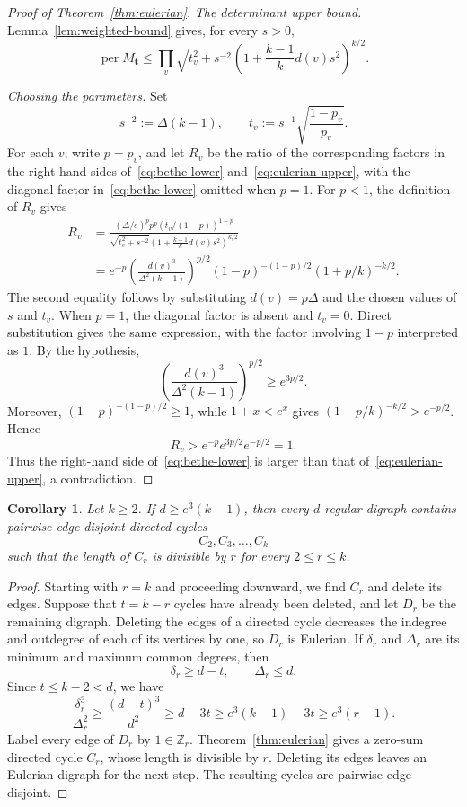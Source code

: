 \documentclass[11pt]{amsart}
\newtheorem{corollary}[theorem]{Corollary}
\theoremstyle{remark}
\newcommand{\per}{\operatorname{per}}
\begin{document}
\begin{proof}[Proof of Theorem~\ref{thm:eulerian}]
\medskip\noindent
\emph{The determinant upper bound.}
Lemma~\ref{lem:weighted-bound} gives, for every $s>0$,
\begin{equation}\label{eq:eulerian-upper}
  \per M_{\mathbf t}
  \le
  \prod_v
  \sqrt{t_v^2+s^{-2}}
  \left(1+\frac{k-1}{k}d(v)s^2\right)^{k/2}.
\end{equation}

\medskip\noindent
\emph{Choosing the parameters.}
Set
\[
  s^{-2}:=\Delta(k-1),
  \qquad
  t_v
  :=s^{-1}\sqrt{\frac{1-p_v}{p_v}}.
\]
For each $v$, write $p=p_v$, and let $R_v$ be the ratio of the
corresponding factors in the right-hand
sides of~\eqref{eq:bethe-lower} and~\eqref{eq:eulerian-upper}, with the
diagonal factor in~\eqref{eq:bethe-lower} omitted when $p=1$.
For $p<1$, the definition of $R_v$ gives
\begin{align*}
  R_v
  &=
  \frac{(\Delta/e)^p p^p
    \left(t_v/(1-p)\right)^{1-p}}
  {\sqrt{t_v^2+s^{-2}}
    \left(1+\frac{k-1}{k}d(v)s^2\right)^{k/2}}\\
  &=e^{-p}
  \left(\frac{d(v)^3}{\Delta^2(k-1)}\right)^{p/2}
  (1-p)^{-(1-p)/2}
  (1+p/k)^{-k/2}.
\end{align*}
The second equality follows by substituting $d(v)=p\Delta$ and the
chosen values of $s$ and $t_v$.
When $p=1$, the diagonal factor is absent and $t_v=0$.  Direct
substitution gives the same expression, with the factor involving
$1-p$ interpreted as $1$.  By the hypothesis,
\[
  \left(\frac{d(v)^3}{\Delta^2(k-1)}\right)^{p/2}
  \ge e^{3p/2}.
\]
Moreover, $(1-p)^{-(1-p)/2}\ge1$, while $1+x<e^x$ gives
$(1+p/k)^{-k/2}>e^{-p/2}$.  Hence
\[
  R_v>e^{-p}e^{3p/2}e^{-p/2}=1.
\]
Thus the right-hand side of~\eqref{eq:bethe-lower} is larger than that
of~\eqref{eq:eulerian-upper}, a contradiction.
\end{proof}

\begin{corollary}\label{cor:all-moduli}
Let $k\ge2$.  If $d\ge e^3(k-1)$, then every $d$-regular digraph
contains pairwise edge-disjoint directed cycles
\[
  C_2,C_3,\ldots,C_k
\]
such that the length of $C_r$ is divisible by $r$ for every
$2\le r\le k$.
\end{corollary}

\begin{proof}
Starting with $r=k$ and proceeding downward, we find $C_r$ and delete
its edges.  Suppose that $t=k-r$ cycles have already been deleted, and
let $D_r$ be the remaining digraph.  Deleting the edges of a directed
cycle decreases the indegree and outdegree of each of its vertices by
one, so $D_r$ is Eulerian.  If $\delta_r$ and $\Delta_r$ are its minimum
and maximum common degrees, then
\[
  \delta_r\ge d-t,
  \qquad
  \Delta_r\le d.
\]
Since $t\le k-2<d$, we have
\[
  \frac{\delta_r^3}{\Delta_r^2}
  \ge \frac{(d-t)^3}{d^2}
  \ge d-3t
  \ge e^3(k-1)-3t
  \ge e^3(r-1).
\]
Label every edge of $D_r$ by $1\in\mathbb Z_r$.  Theorem~\ref{thm:eulerian}
gives a zero-sum directed cycle $C_r$, whose length is divisible by
$r$.  Deleting its edges leaves an Eulerian digraph for the next step.
The resulting cycles are pairwise edge-disjoint.
\end{proof}
\end{document}
